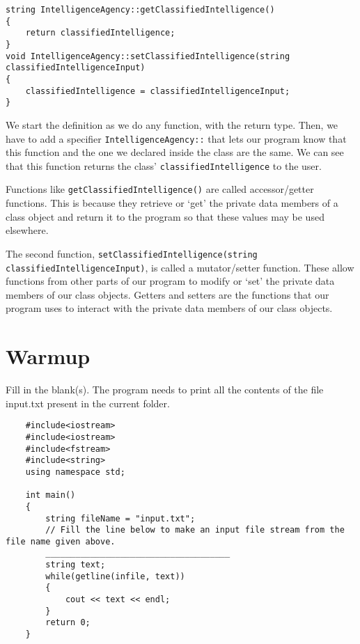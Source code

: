\begin{verbatim}
string IntelligenceAgency::getClassifiedIntelligence()
{
    return classifiedIntelligence;
}
void IntelligenceAgency::setClassifiedIntelligence(string classifiedIntelligenceInput)
{
    classifiedIntelligence = classifiedIntelligenceInput;
}
\end{verbatim}

We start the definition as we do any function, with the return type. Then, we have to add a specifier \texttt{IntelligenceAgency::} that lets our program know that this function and the one we declared inside the class are the same. We can see that this function returns the class’ \texttt{classifiedIntelligence} to the user.

Functions like \texttt{getClassifiedIntelligence()} are called accessor/getter functions. This is because they retrieve or `get’ the private data members of a class object and return it to the program so that these values may be used elsewhere.

The second function, \texttt{setClassifiedIntelligence(string classifiedIntelligenceInput)}, is called a mutator/setter function. These allow functions from other parts of our program to modify or ‘set’ the private data members of our class objects. Getters and setters are the functions that our program uses to interact with the private data members of our class objects.

\section{Warmup}

\begin{problem}
Fill in the blank(s). The program needs to print all the contents of the file input.txt present in the current folder.
\begin{verbatim}
    #include<iostream>
    #include<iostream>
    #include<fstream>
    #include<string>
    using namespace std;
    
    int main() 
    {
        string fileName = "input.txt";
        // Fill the line below to make an input file stream from the file name given above.
        _____________________________________
        string text;  
        while(getline(infile, text))
        {      
            cout << text << endl;
        }
        return 0;
    }

\end{verbatim}

\end{problem}

